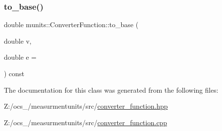 \mbox{\label{classmunits_1_1_converter_function_a4046b7450750f1becd45b63a811b14f0}} 
\subsubsection{\texorpdfstring{to\+\_\+base()}{to\_base()}}
{\footnotesize\ttfamily double munits\+::\+Converter\+Function\+::to\+\_\+base (\begin{DoxyParamCaption}\item[{double}]{v,  }\item[{double}]{e = {} }\end{DoxyParamCaption}) const}



The documentation for this class was generated from the following files\+:\begin{DoxyCompactItemize}
\item 
Z\+:/ocs\+\_/measurmentunits/src/\hyperlink{converter__function_8hpp}{converter\+\_\+function.\+hpp}\item 
Z\+:/ocs\+\_/measurmentunits/src/\hyperlink{converter__function_8cpp}{converter\+\_\+function.\+cpp}\end{DoxyCompactItemize}
